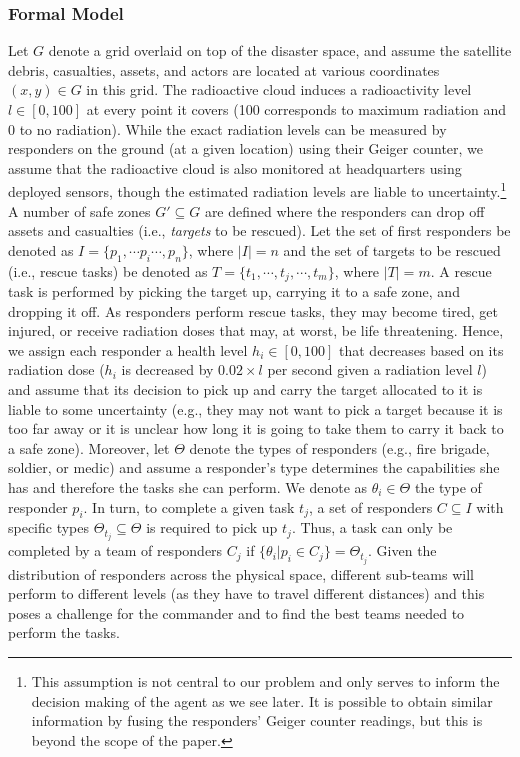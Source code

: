 \subsubsection{Formal Model}
\noindent Let $G$ denote a grid overlaid on top of the disaster space, and assume the satellite debris, casualties, assets, and actors are located at various coordinates $(x,y) \in G$ in this grid. The radioactive cloud induces a radioactivity level  $l \in [0,100]$ at every point it covers (100 corresponds to maximum radiation and 0 to no radiation). While the exact radiation levels can be measured by responders on the ground (at a given location) using their Geiger counter, we assume that the radioactive cloud is also monitored at headquarters using deployed sensors, though the estimated radiation levels are liable to uncertainty.\footnote{This assumption is not central to our problem and only serves to inform the decision making of the agent as we see later. It is  possible to obtain similar information by fusing the responders' Geiger counter readings, but this is beyond the scope of the paper.}  A number of safe zones $G' \subseteq G$ are defined where the responders can drop off assets and casualties (i.e., \emph{targets} to be rescued). Let the set of first responders be denoted as $I = \{p_1, \cdots p_i \cdots, p_n\}$, where $|I| = n$ and the set of  targets to be rescued (i.e., rescue tasks) be denoted as  $T = \{t_1,\cdots, t_j, \cdots, t_m\}$, where $|T| = m$. A rescue task is performed by picking the target up, carrying it to a safe zone, and dropping it off.  As responders perform rescue tasks, they may become tired, get injured, or receive radiation doses that may, at worst, be life threatening. Hence, we assign each responder  a health level $h_i\in [0,100]$ that decreases based on its radiation dose ($h_i$ is decreased by $0.02 \times l$ per second given a radiation level $l$) and assume that its decision to pick up and carry the target allocated to it is liable to some uncertainty (e.g., they may not want to pick a target because it is too far away or it is unclear how long it is going to take them to  carry it back  to a safe zone).  Moreover, let $\Theta$ denote the types of responders (e.g., fire brigade, soldier, or medic)  and assume a responder's type determines the capabilities  she has and therefore the tasks  she can perform. We denote as $\theta_i \in \Theta$ the type of responder $p_i$. In turn, to complete a given task $t_j$,  a set of responders $C \subseteq I$ with specific types $\Theta_{t_j} \subseteq \Theta$ is required to pick up $t_j$. Thus, a task can only be completed by a team of responders $C_j$ if $\{\theta_i | p_i \in C_j\} = \Theta_{t_j}$. Given the distribution of responders across the physical space, different sub-teams will perform to different levels (as they have to travel different distances) and this poses a challenge for the commander and to find the best teams needed to perform the tasks.
